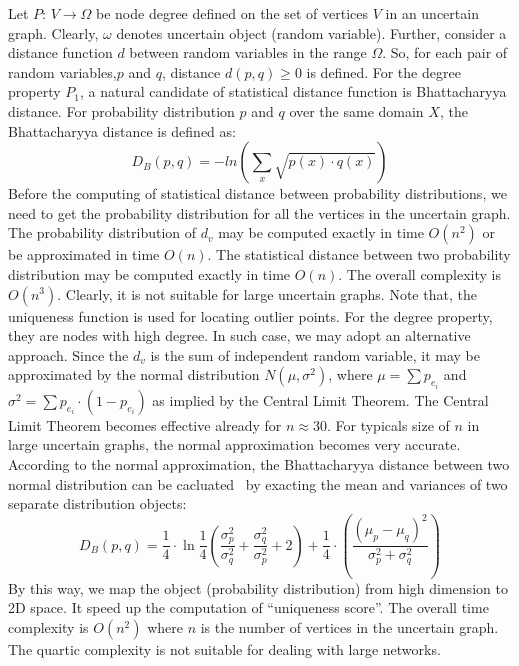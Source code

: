 Let $P$: $V \rightarrow \Omega$ be node degree defined on the set of vertices $V$ in an uncertain graph. Clearly, $\omega$ denotes uncertain object (random variable). Further, consider a distance function $d$ between  random variables in the range $\Omega$. So, for each pair of random variables,$p$ and $q$, distance $d(p,q) \ge 0$ is defined. For the degree property $P_{1}$, a natural candidate of statistical distance function is Bhattacharyya distance. For probability distribution $p$ and $q$ over the same domain $X$, the Bhattacharyya distance is defined as: 
\begin{equation*}
    D_{B}(p,q)=-ln(\sum_{x} \sqrt{p(x) \cdot q(x)})
\end{equation*}
Before the computing of statistical distance between probability distributions, we need to get the probability distribution for all the vertices in the uncertain graph. The probability distribution of $d_{v}$ may be computed exactly in time $O(n^2)$ or be approximated in time $O(n)$. The statistical distance between two probability distribution may be computed exactly in time $O(n)$. The overall complexity is $O(n^{3})$. Clearly, it is not suitable for large uncertain graphs. Note that, the uniqueness function is used for locating outlier points. For the degree property, they are nodes with high degree. In such case, we may adopt an alternative approach. Since the $d_{v}$ is the sum of independent random variable, it may be approximated by the normal distribution $N(\mu, \sigma^{2})$, where $\mu= \sum p_{e_i}$  and $\sigma^2= \sum p_{e_i} \cdot (1-p_{e_{i}})$ as implied by the Central Limit Theorem. The Central Limit Theorem becomes effective already for $n \approx 30$. For typicals size of $n$ in large uncertain graphs, the normal approximation becomes very accurate. According to the normal approximation, the Bhattacharyya distance between two normal distribution can be cacluated~\cite{} by exacting the mean and variances of two separate distribution objects: 
\begin{equation*}
    D_{B}(p,q)=\frac{1}{4} \cdot \ln{\frac{1}{4} 
                (\frac{\sigma_{p}^2}{\sigma_{q}^2} + \frac{\sigma_{q}^2}{\sigma_{p}^2}+2)}+
                \frac{1}{4} \cdot (\frac{(\mu_{p}-\mu_{q})^{2}}{\sigma_{p}^2+ \sigma_{q}^2})
\end{equation*} 
By this way, we map the object (probability distribution) from high dimension to 2D space. It speed up the computation of ``uniqueness score''. The overall time complexity is $O(n^2)$ where $n$ is the number of vertices in the uncertain graph. The quartic complexity is not suitable for dealing with large networks. 

